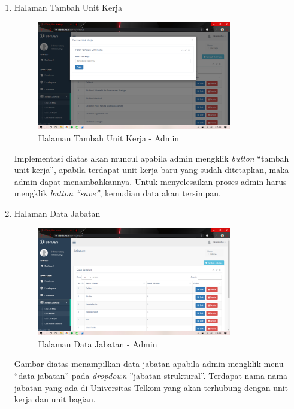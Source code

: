 \begin{enumerate}
	\newpage
	\item Halaman Tambah Unit Kerja
	\begin{figure}
		\centering
		\includegraphics[width=0.8\textwidth]
		{pics/admin/implementasi/tambahunitkerja.png}
		\caption{Halaman Tambah Unit Kerja - Admin}
		\label{fig:CC10}
	\end{figure}
	Implementasi diatas akan muncul apabila admin mengklik \textit{button} “tambah unit kerja”, apabila terdapat unit kerja baru yang sudah ditetapkan, maka admin dapat menambahkannya. Untuk menyelesaikan proses admin harus mengklik \textit{button “save”}, kemudian data akan tersimpan.
	
	\item Halaman Data Jabatan
	\begin{figure}
		\centering
		\includegraphics[width=0.8\textwidth]
		{pics/admin/implementasi/datajabatan.png}
		\caption{Halaman Data Jabatan - Admin}
		\label{fig:CC10}
	\end{figure}
	Gambar diatas menampilkan data jabatan apabila admin mengklik menu “data jabatan” pada \textit{dropdown} ”jabatan struktural”. Terdapat nama-nama jabatan yang ada di Universitas Telkom yang akan terhubung dengan unit kerja dan unit bagian.  
	

\end{enumerate}
